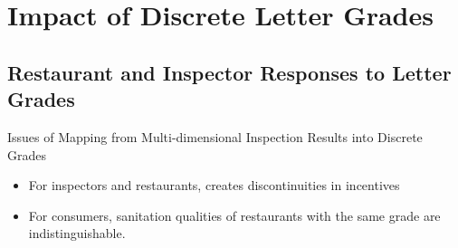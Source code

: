 \documentclass[handout]{beamer}
\begin{document}

\section{Impact of Discrete Letter Grades}
\subsection{Restaurant and Inspector Responses to Letter Grades}
\begin{frame}{Issues of Mapping from Multi-dimensional Inspection Results into Discrete Grades}
\begin{itemize}
\item For inspectors and restaurants, creates discontinuities in incentives
\item For consumers, sanitation qualities of restaurants with the same grade are indistinguishable. 
\end{itemize}
\end{frame}
\end{document}
